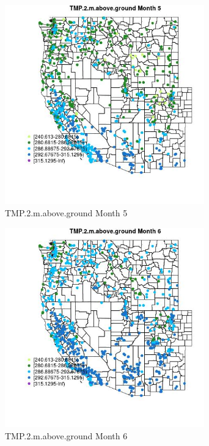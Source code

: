 \begin{figure} 
\centering  
\includegraphics[width=0.77\textwidth]{Code_Outputs/Report_ML_input_PM25_Step4_part_f_de_duplicated_aves_prioritize_24hr_obswNAs_MapObsMo5TMP2maboveground.jpg} 
\caption{\label{fig:Report_ML_input_PM25_Step4_part_f_de_duplicated_aves_prioritize_24hr_obswNAsMapObsMo5TMP2maboveground}TMP.2.m.above.ground Month 5} 
\end{figure} 
 

\begin{figure} 
\centering  
\includegraphics[width=0.77\textwidth]{Code_Outputs/Report_ML_input_PM25_Step4_part_f_de_duplicated_aves_prioritize_24hr_obswNAs_MapObsMo6TMP2maboveground.jpg} 
\caption{\label{fig:Report_ML_input_PM25_Step4_part_f_de_duplicated_aves_prioritize_24hr_obswNAsMapObsMo6TMP2maboveground}TMP.2.m.above.ground Month 6} 
\end{figure} 
 

